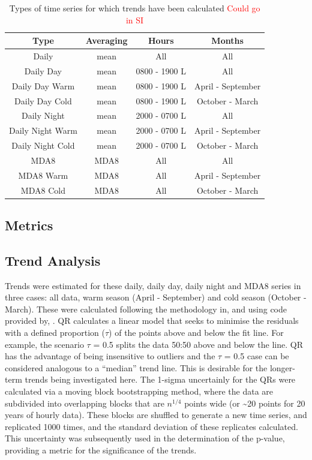 \documentclass[journal abbreviation, manuscript]{copernicus}
\begin{document}
\begin{table}[h]
\caption{Types of time series for which trends have been calculated \textcolor{red}{Could go in SI}}
\begin{tabular}{c|c c c}
Type              & Averaging & Hours         & Months            \\ \hline
Daily             & mean      & All           & All               \\
Daily Day         & mean      & 0800 - 1900 L & All               \\
Daily Day Warm    & mean      & 0800 - 1900 L & April - September \\
Daily Day Cold    & mean      & 0800 - 1900 L & October - March   \\
Daily Night       & mean      & 2000 - 0700 L & All               \\
Daily Night Warm  & mean      & 2000 - 0700 L & April - September \\
Daily Night Cold  & mean      & 2000 - 0700 L & October - March   \\
MDA8              & MDA8      & All           & All               \\
MDA8 Warm         & MDA8      & All           & April - September \\
MDA8 Cold         & MDA8      & All           & October - March   \\
\end{tabular}
\label{tab:ts_types}
\end{table}

\subsection{Metrics}

\subsection{Trend Analysis}
Trends were estimated for these daily, daily day, daily night and MDA8 series in three cases: all data, warm season (April - September) and cold season (October - March). These were calculated following the methodology in, and using code provided by, \cite{chang2023guidancenotebeststatistical}. QR calculates a linear model that seeks to minimise the residuals with a defined proportion ($\tau$) of the points above and below the fit line. For example, the scenario $\tau$ = 0.5 splits the data 50:50 above and below the line. QR has the advantage of being insensitive to outliers and the $\tau$ = 0.5 case can be considered analogous to a “median” trend line. This is desirable for the longer-term trends being investigated here. The 1-sigma uncertainly for the QRs were calculated via a moving block bootstrapping method, where the data are subdivided into overlapping blocks that are $n^{1/4}$ points wide (or \textasciitilde{20} points for 20 years of hourly data). These blocks are shuffled to generate a new time series, and replicated 1000 times, and the standard deviation of these replicates calculated. This uncertainty was subsequently used in the determination of the p-value, providing a metric for the significance of the trends. 
\end{document}
